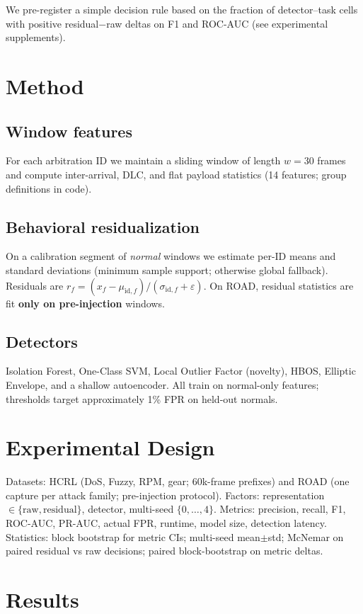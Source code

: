 \documentclass[conference]{IEEEtran}
\begin{document}
We pre-register a simple decision rule based on the fraction of detector--task cells with positive residual$-$raw deltas on F1 and ROC-AUC (see experimental supplements).

\section{Method}
\subsection{Window features}
For each arbitration ID we maintain a sliding window of length $w=30$ frames and compute inter-arrival, DLC, and flat payload statistics (14 features; group definitions in code).

\subsection{Behavioral residualization}
On a calibration segment of \emph{normal} windows we estimate per-ID means and standard deviations (minimum sample support; otherwise global fallback).
Residuals are $r_f=(x_f-\mu_{\mathrm{id},f})/(\sigma_{\mathrm{id},f}+\varepsilon)$.
On ROAD, residual statistics are fit \textbf{only on pre-injection} windows.

\subsection{Detectors}
Isolation Forest, One-Class SVM, Local Outlier Factor (novelty), HBOS, Elliptic Envelope, and a shallow autoencoder.
All train on normal-only features; thresholds target approximately 1\% FPR on held-out normals.

\section{Experimental Design}
Datasets: HCRL (DoS, Fuzzy, RPM, gear; 60k-frame prefixes) and ROAD (one capture per attack family; pre-injection protocol).
Factors: representation $\in\{\mathrm{raw},\mathrm{residual}\}$, detector, multi-seed $\{0,\ldots,4\}$.
Metrics: precision, recall, F1, ROC-AUC, PR-AUC, actual FPR, runtime, model size, detection latency.
Statistics: block bootstrap for metric CIs; multi-seed mean$\pm$std; McNemar on paired residual vs raw decisions; paired block-bootstrap on metric deltas.

\section{Results}
\end{document}
